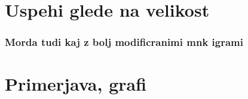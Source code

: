 \documentclass[12pt,a4paper]{amsart}
\theoremstyle{definition} %
\theoremstyle{plain} %
\newtheorem{izrek}[definicija]{Izrek}
\begin{document}
\section{Uspehi glede na velikost}
\subsubsection{Morda tudi kaj z bolj modificranimi mnk igrami}

\section{Primerjava, grafi}









%
%
%
%
%
%
%
\end{document}
